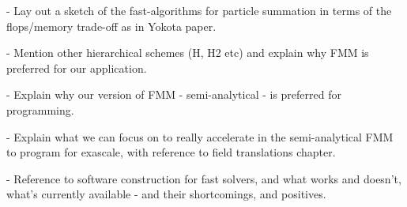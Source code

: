 - Lay out a sketch of the fast-algorithms for particle summation in terms of the flops/memory trade-off as in Yokota paper.

- Mention other hierarchical schemes (H, H2 etc) and explain why FMM is preferred for our application.

- Explain why our version of FMM - semi-analytical - is preferred for programming.

- Explain what we can focus on to really accelerate in the semi-analytical FMM to program for exascale, with reference to field translations chapter.

- Reference to software construction for fast solvers, and what works and doesn't, what's currently available - and their shortcomings, and positives.

